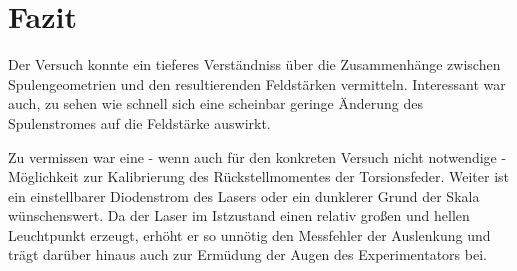 \chapter{Fazit}
Der Versuch konnte ein tieferes Verständniss über die Zusammenhänge zwischen Spulengeometrien und den resultierenden
Feldstärken vermitteln. Interessant war auch, zu sehen wie schnell sich eine scheinbar geringe Änderung des Spulenstromes
auf die Feldstärke auswirkt.
\par
\hspace{1cm}Zu vermissen war eine - wenn auch für den konkreten Versuch nicht notwendige - Möglichkeit zur Kalibrierung
des Rückstellmomentes der Torsionsfeder. Weiter ist ein einstellbarer Diodenstrom des Lasers oder ein dunklerer Grund der
Skala wünschenswert. Da der Laser im Istzustand einen relativ großen und hellen Leuchtpunkt erzeugt, erhöht er so unnötig
den Messfehler der Auslenkung und trägt darüber hinaus auch zur Ermüdung der Augen des Experimentators bei.